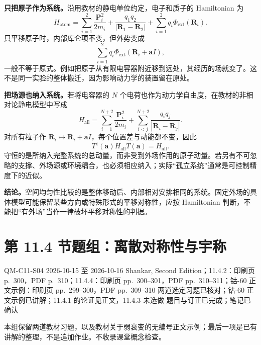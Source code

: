 \begin{checkedsolution}
\textbf{只把原子作为系统。}沿用教材的静电单位约定，电子和质子的 Hamiltonian 为
\begin{equation}
  H_{\mathrm{atom}}
   =\sum_{i=1}^2\frac{\mathbf P_i^2}{2m_i}
    +\frac{q_1q_2}{|\mathbf R_1-\mathbf R_2|}
    +\sum_{i=1}^2q_i\Phi_{\mathrm{ext}}(\mathbf R_i).
\end{equation}
只平移原子时，内部库仑项不变，但外势变成
\begin{equation}
  \sum_{i=1}^2q_i\Phi_{\mathrm{ext}}(\mathbf R_i+\mathbf aI),
\end{equation}
一般不等于原式。例如把原子从有限电容器附近移到远处，其经历的场就变了。这不是同一实验的整体搬迁，因为影响动力学的装置留在原处。

\textbf{把场源也纳入系统。}若将电容器的 $N$ 个电荷也作为动力学自由度，在教材的非相对论静电模型中写成
\begin{equation}
  H_{\mathrm{all}}
   =\sum_{i=1}^{N+2}\frac{\mathbf P_i^2}{2m_i}
     +\sum_{i<j}^{N+2}\frac{q_iq_j}{|\mathbf R_i-\mathbf R_j|}.
\end{equation}
对所有粒子作 $\mathbf R_i\mapsto\mathbf R_i+\mathbf aI$，每个位置差与动能都不变，因此
\begin{equation}
  T^\dagger(\mathbf a)H_{\mathrm{all}}T(\mathbf a)=H_{\mathrm{all}}.
\end{equation}
守恒的是所纳入完整系统的总动量，而非受到外场作用的原子动量。若另有不可忽略的支撑、外场源或环境耦合，也必须相应纳入；实际“孤立系统”通常是可控制精度下的近似。

\textbf{结论。}空间均匀性比较的是整体移动后、内部相对安排相同的系统。固定外场的具体模型可能保留某些方向或特殊形式的平移对称性，应按 Hamiltonian 判断，不能把“有外场”当作一律破坏平移对称性的判据。
\end{checkedsolution}

\section{第 11.4 节题组：离散对称性与宇称}
\label{exercises:QM-C11-S04}
\exercisemeta
  {QM-C11-S04}
  {2026-10-15 至 2026-10-16}
  {Shankar, Second Edition；11.4.2：印刷页 p.~300，PDF p.~310；11.4.4：印刷页 pp.~300--301，PDF pp.~310--311；钴-60 正文示例：印刷页 pp.~299--300，PDF pp.~309--310}
  {两道选定习题已核对；钴-60 正文示例已讲解；11.4.1 的论证见正文，11.4.3 未选做}
  {题目与订正已完成；笔记已确认}

本组保留两道教材习题，以及教材关于弱衰变的无编号正文示例；最后一项是已有讲解的整理，不是追加作业。不收录课堂概念检查。

